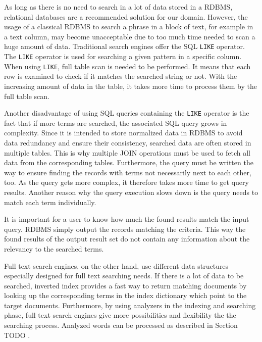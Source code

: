 
As long as there is no need to search in a lot of data stored in a RDBMS, relational databases are a recommended solution for our domain.
However, the usage of a classical RDBMS to search a phrase in a block of text, for example in a text column, may become unacceptable due to too much time needed to scan a huge amount of data.
Traditional search engines offer the SQL \texttt{LIKE} operator. 
The \texttt{LIKE} operator is used for searching a given pattern in a specific column.
When using \texttt{LIKE}, full table scan is needed to be performed. 
It means that each row is examined to check if it matches the searched string or not. 
With the increasing amount of data in the table, it takes more time to process them by the full table scan.

Another disadvantage of using SQL queries containing the \texttt{LIKE} operator is the fact that if more terms are searched, the associated SQL query grows in complexity.
Since it is intended to store normalized data in RDBMS to avoid data redundancy and ensure their consistency, searched data are often stored in multiple tables.
This is why multiple JOIN operations must be used to fetch all data from the corresponding tables.
Furthermore, the query must be written the way to ensure finding the records with terms not necessarily next to each other, too. 
As the query gets more complex, it therefore takes more time to get query results.
Another reason why the query execution slows down is the query needs to match each term individually.

It is important for a user to know how much the found results match the input query. 
RDBMS simply output the records matching the criteria.
This way the found results of the output result set do not contain any information about the relevancy to the searched terms. 

Full text search engines, on the other hand, use different data structures especially designed for full text searching needs.
If there is a lot of data to be searched, inverted index provides a fast way to return matching documents by looking up the corresponding terms in the index dictionary which point to the target documents.
Furthermore, by using analyzers in the indexing and searching phase, full text search engines give more possibilities and flexibility the the searching process. 
Analyzed words can be processed as described in Section TODO .

